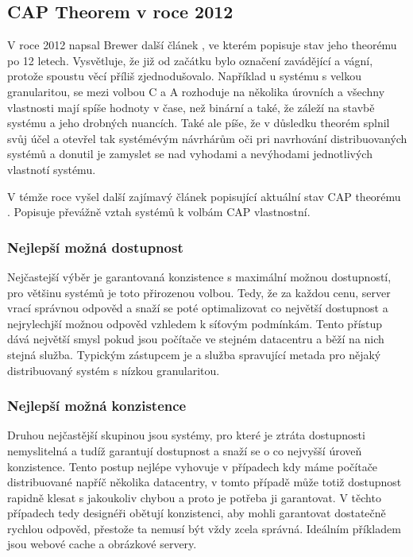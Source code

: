 \subsection{CAP Theorem v roce 2012}
V roce 2012 napsal Brewer další článek \cite{cap2}, ve kterém popisuje stav jeho theorému po 12 letech. Vysvětluje, že již od začátku bylo označení  zavádějící a vágní, protože spoustu věcí příliš zjednodušovalo. Například u systému s velkou granularitou,  se mezi volbou C a A rozhoduje na několika úrovních a všechny vlastnosti mají spíše hodnoty v čase, než binární a také, že záleží na stavbě systému a jeho drobných nuancích. Také ale píše, že v důsledku theorém splnil svůj účel a otevřel tak systémévým návrhárům oči pri navrhování distribuovaných systémů a donutil je zamyslet se nad vyhodami a nevýhodami jednotlivých vlastnotí systému. 

V témže roce vyšel další zajímavý článek popisující aktuální stav CAP theorému \cite{cap3}. Popisuje převážně vztah
systémů k volbám CAP vlastnostní. 

\subsubsection{Nejlepší možná dostupnost}
Nejčastejší výběr je garantovaná konzistence s maximální možnou dostupností, pro většinu systémů je toto přirozenou volbou. Tedy, že za každou cenu, server vrací správnou odpověd a snaží se poté optimalizovat co největší dostupnost a nejrylechjší možnou odpověd vzhledem k síťovým podmínkám. Tento přístup dává největší smysl pokud jsou počítače ve stejném datacentru a běží na nich stejná služba. Typickým zástupcem je   a služba spravující metada pro nějaký distribuovaný systém s nízkou granularitou.

\subsubsection{Nejlepší možná konzistence} 
Druhou nejčastější skupinou jsou systémy, pro které je ztráta dostupnosti nemyslitelná a tudíž garantují dostupnost a snaží se o co nejvyšší úroveň konzistence. Tento postup nejlépe vyhovuje v případech kdy máme počítače distribuované napříč několika datacentry, v tomto případě může totiž dostupnost rapidně klesat s jakoukoliv chybou a proto je potřeba ji garantovat. V těchto případech tedy designéři obětují konzistenci, aby mohli garantovat dostatečně rychlou odpověd, přestože ta nemusí být vždy zcela správná. Ideálním příkladem jsou webové cache a obrázkové servery.

